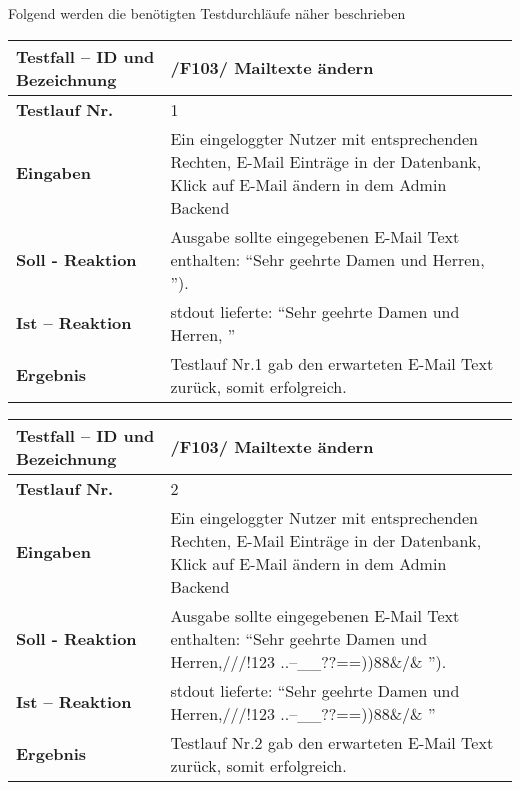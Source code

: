 Folgend werden die benötigten Testdurchläufe näher beschrieben
\begin{longtable}{|p{5cm}|p{10cm}|}
\hline
\textbf{Testfall -- ID und Bezeichnung} & \textnormal{/F103/ Mailtexte ändern} \\
\hline
\textbf{Testlauf Nr.} & \textnormal{1} \\
\hline
\textbf{Eingaben} & \textnormal{Ein eingeloggter Nutzer mit entsprechenden Rechten, E-Mail 
Einträge in der Datenbank, Klick auf E-Mail ändern in dem Admin Backend } \\
\hline
\textbf{Soll - Reaktion} & \textnormal{Ausgabe sollte eingegebenen E-Mail
Text enthalten: "`Sehr geehrte Damen und Herren, "').
} \\
\hline
\textbf{Ist -- Reaktion} & \textnormal{stdout lieferte: "`Sehr geehrte Damen und Herren, "'} \\
\hline
\textbf{Ergebnis} & \textnormal{Testlauf Nr.1 gab den erwarteten E-Mail Text zurück, somit erfolgreich.} \\
\hline
 \end{longtable}
 
\begin{longtable}{|p{5cm}|p{10cm}|}
\hline
\textbf{Testfall -- ID und Bezeichnung} & \textnormal{/F103/ Mailtexte ändern} \\
\hline
\textbf{Testlauf Nr.} & \textnormal{2} \\
\hline
\textbf{Eingaben} & \textnormal{Ein eingeloggter Nutzer mit entsprechenden Rechten, E-Mail 
Einträge in der Datenbank, Klick auf E-Mail ändern in dem Admin Backend } \\
\hline
\textbf{Soll - Reaktion} & \textnormal{Ausgabe sollte eingegebenen E-Mail
Text enthalten: "`Sehr geehrte Damen und Herren,///!123 
                    ..--\_\_??==))88\&/\& "').
} \\
\hline
\textbf{Ist -- Reaktion} & \textnormal{stdout lieferte: "`Sehr geehrte Damen und Herren,///!123 
                    ..--\_\_??==))88\&/\& "'} \\
\hline
\textbf{Ergebnis} & \textnormal{Testlauf Nr.2 gab den erwarteten E-Mail Text zurück, somit erfolgreich.} \\
\hline
 \end{longtable} 
 

